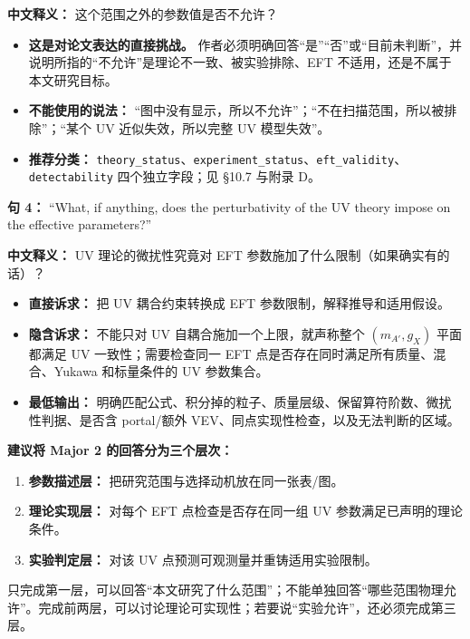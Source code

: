 \documentclass[
]{article}
\providecommand{\tightlist}{%
  \setlength{\itemsep}{0pt}\setlength{\parskip}{0pt}}
\begin{document}
\textbf{中文释义：} 这个范围之外的参数值是否不允许？

\begin{itemize}
\tightlist
\item
  \textbf{这是对论文表达的直接挑战。}
  作者必须明确回答``是''``否''或``目前未判断''，并说明所指的``不允许''是理论不一致、被实验排除、EFT
  不适用，还是不属于本文研究目标。
\item
  \textbf{不能使用的说法：}
  ``图中没有显示，所以不允许''；``不在扫描范围，所以被排除''；``某个 UV
  近似失效，所以完整 UV 模型失效''。
\item
  \textbf{推荐分类：}
  \texttt{theory\_status}、\texttt{experiment\_status}、\texttt{eft\_validity}、\texttt{detectability}
  四个独立字段；见 §10.7 与附录 D。
\end{itemize}

\textbf{句 4：} ``What, if anything, does the perturbativity of the UV
theory impose on the effective parameters?''

\textbf{中文释义：} UV 理论的微扰性究竟对 EFT
参数施加了什么限制（如果确实有的话）？

\begin{itemize}
\tightlist
\item
  \textbf{直接诉求：} 把 UV 耦合约束转换成 EFT
  参数限制，解释推导和适用假设。
\item
  \textbf{隐含诉求：} 不能只对 UV 自耦合施加一个上限，就声称整个
  \((m_{A'},g_X)\) 平面都满足 UV 一致性；需要检查同一 EFT
  点是否存在同时满足所有质量、混合、Yukawa 和标量条件的 UV 参数集合。
\item
  \textbf{最低输出：}
  明确匹配公式、积分掉的粒子、质量层级、保留算符阶数、微扰性判据、是否含
  portal/额外 VEV、同点实现性检查，以及无法判断的区域。
\end{itemize}

\textbf{建议将 Major 2 的回答分为三个层次：}

\begin{enumerate}
\def\labelenumi{\arabic{enumi}.}
\tightlist
\item
  \textbf{参数描述层：} 把研究范围与选择动机放在同一张表/图。
\item
  \textbf{理论实现层：} 对每个 EFT 点检查是否存在同一组 UV
  参数满足已声明的理论条件。
\item
  \textbf{实验判定层：} 对该 UV 点预测可观测量并重铸适用实验限制。
\end{enumerate}

只完成第一层，可以回答``本文研究了什么范围''；不能单独回答``哪些范围物理允许''。完成前两层，可以讨论理论可实现性；若要说``实验允许''，还必须完成第三层。
\end{document}
